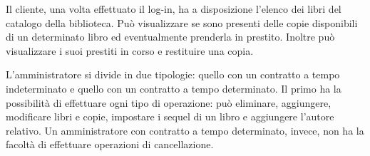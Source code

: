 \documentclass[a4paper,10pt]{article}
\begin{document}
Il cliente, una volta effettuato il log-in, ha a disposizione l'elenco dei libri del catalogo della biblioteca. Può visualizzare se sono presenti delle copie disponibili di un determinato libro ed eventualmente prenderla in prestito.
Inoltre può visualizzare i suoi prestiti in corso e restituire una copia.

L'amministratore si divide in due tipologie: quello con un contratto a tempo indeterminato e quello con un contratto a tempo determinato. 
Il primo ha la possibilità di effettuare ogni tipo di operazione: può eliminare, aggiungere, modificare libri e copie, impostare i sequel di un libro e aggiungere l'autore relativo.
Un amministratore con contratto a tempo determinato, invece, non ha la facoltà di effettuare operazioni di cancellazione.
\end{document}
